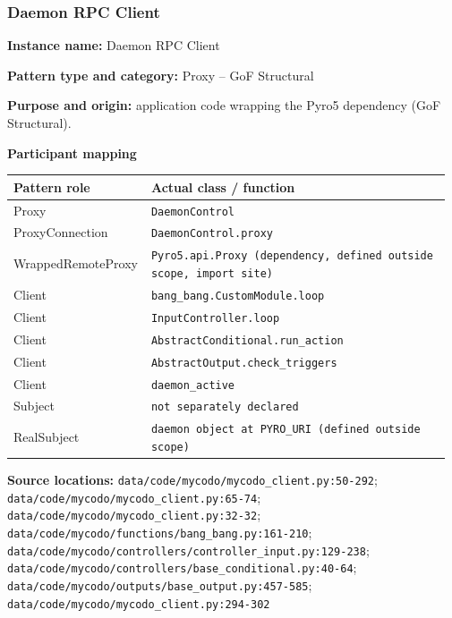 \documentclass[11pt,a4paper]{article}
\newcommand{\field}[2]{\textbf{#1:} #2\par}
\begin{document}
\subsubsection{Daemon RPC Client}
\field{Instance name}{Daemon RPC Client}
\field{Pattern type and category}{Proxy -- GoF Structural}
\field{Purpose and origin}{application code wrapping the Pyro5 dependency (GoF Structural).}
\textbf{Participant mapping}\par
{\small\setlength{\tabcolsep}{3pt}
\begin{longtable}{@{}P{0.29\linewidth}P{0.68\linewidth}@{}}\toprule
\textbf{Pattern role} & \textbf{Actual class / function} \\ \midrule\endhead
Proxy & \texttt{DaemonControl} \\
ProxyConnection & \texttt{DaemonControl.\allowbreak{}proxy} \\
WrappedRemoteProxy & \texttt{Pyro5.\allowbreak{}api.\allowbreak{}Proxy (dependency, defined outside scope, import site)} \\
Client & \texttt{bang\_\allowbreak{}bang.\allowbreak{}CustomModule.\allowbreak{}loop} \\
Client & \texttt{InputController.\allowbreak{}loop} \\
Client & \texttt{AbstractConditional.\allowbreak{}run\_\allowbreak{}action} \\
Client & \texttt{AbstractOutput.\allowbreak{}check\_\allowbreak{}triggers} \\
Client & \texttt{daemon\_\allowbreak{}active} \\
Subject & \texttt{not separately declared} \\
RealSubject & \texttt{daemon object at PYRO\_\allowbreak{}URI (defined outside scope)} \\
\bottomrule\end{longtable}}
\textbf{Source locations:} \texttt{data/\allowbreak{}code/\allowbreak{}mycodo/\allowbreak{}mycodo\_\allowbreak{}client.\allowbreak{}py:50-292}; \texttt{data/\allowbreak{}code/\allowbreak{}mycodo/\allowbreak{}mycodo\_\allowbreak{}client.\allowbreak{}py:65-74}; \texttt{data/\allowbreak{}code/\allowbreak{}mycodo/\allowbreak{}mycodo\_\allowbreak{}client.\allowbreak{}py:32-32}; \texttt{data/\allowbreak{}code/\allowbreak{}mycodo/\allowbreak{}functions/\allowbreak{}bang\_\allowbreak{}bang.\allowbreak{}py:161-210}; \texttt{data/\allowbreak{}code/\allowbreak{}mycodo/\allowbreak{}controllers/\allowbreak{}controller\_\allowbreak{}input.\allowbreak{}py:129-238}; \texttt{data/\allowbreak{}code/\allowbreak{}mycodo/\allowbreak{}controllers/\allowbreak{}base\_\allowbreak{}conditional.\allowbreak{}py:40-64}; \texttt{data/\allowbreak{}code/\allowbreak{}mycodo/\allowbreak{}outputs/\allowbreak{}base\_\allowbreak{}output.\allowbreak{}py:457-585}; \texttt{data/\allowbreak{}code/\allowbreak{}mycodo/\allowbreak{}mycodo\_\allowbreak{}client.\allowbreak{}py:294-302}\par
\end{document}
